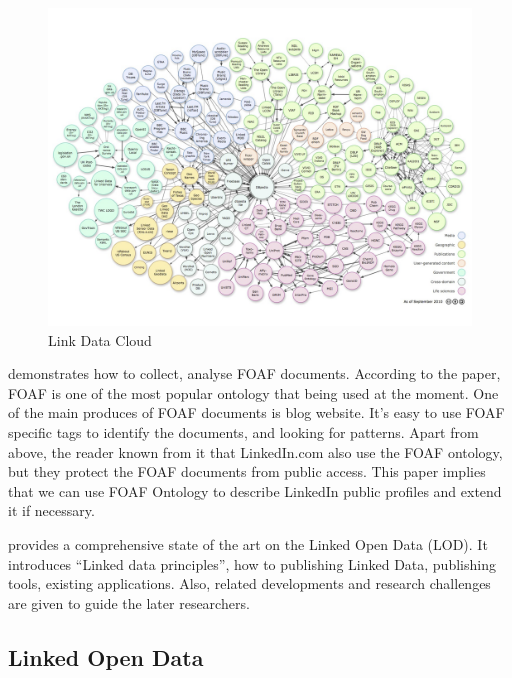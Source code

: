 \begin{description}
\begin{figure}[ht!]
\centering
\includegraphics[width=150mm]{images/link-data-cloud.png}
\caption{Link Data Cloud}
\label{fig:LinkDataCloud}
\end{figure}
\end{description}

\cite{ding2005} demonstrates how to collect, analyse FOAF documents. According to the paper, FOAF is one of the most popular ontology that being used at the moment. One of the main produces of FOAF documents is blog website. It's easy to use FOAF specific tags to identify the documents, and looking for patterns. Apart from above, the reader known from it that LinkedIn.com also use the FOAF ontology, but they protect the FOAF documents from public access. This paper implies that we can use FOAF Ontology to describe LinkedIn public profiles and extend it if necessary. 

\cite{bizer2009} provides a comprehensive state of the art on the Linked Open Data (LOD). It introduces ``Linked data principles'', how to publishing Linked Data, publishing tools, existing applications. Also, related developments and research challenges are given to guide the later researchers.

\subsection{Linked Open Data}

